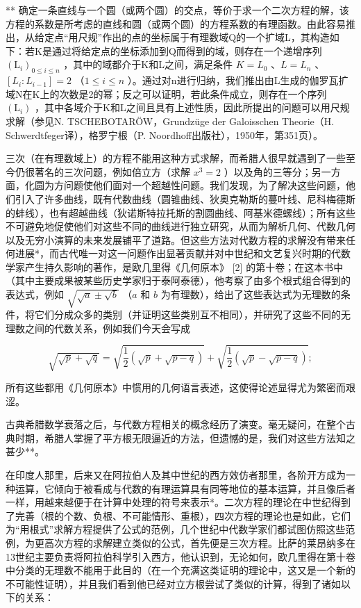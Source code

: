 ** 确定一条直线与一个圆（或两个圆）的交点，等价于求一个二次方程的解，该方程的系数是所考虑的直线和圆（或两个圆）的方程系数的有理函数。由此容易推出，从给定点“用尺规”作出的点的坐标属于有理数域Q的一个扩域L，其构造如下：若K是通过将给定点的坐标添加到Q而得到的域，则存在一个递增序列 \((\mathrm{L}_{i})_{0\leq i\leq n}\) ，其中的域都介于K和L之间，满足条件 \(K=L_{0}\) 、\(L=L_{n}\) 、\([L_{i}:L_{i-1}]=2\) （\(1\leq i\leq n\) ）。通过对n进行归纳，我们推出由L生成的伽罗瓦扩域N在K上的次数是2的幂；反之可以证明，若此条件成立，则存在一个序列 \((\mathrm{L}_{i})\) ，其中各域介于K和L之间且具有上述性质，因此所提出的问题可以用尺规求解（参见N. TSCHEBOTARÖW，Grundzüge der Galoisschen Theorie（H. Schwerdtfeger译），格罗宁根（P. Noordhoff出版社），1950年，第351页）。

三次（在有理数域上）的方程不能用这种方式求解，而希腊人很早就遇到了一些至今仍很著名的三次问题，例如倍立方（求解 \(x^3 = 2\) ）以及角的三等分；另一方面，化圆为方问题使他们面对一个超越性问题。我们发现，为了解决这些问题，他们引入了许多曲线，既有代数曲线（圆锥曲线、狄奥克勒斯的蔓叶线、尼科梅德斯的蚌线），也有超越曲线（狄诺斯特拉托斯的割圆曲线、阿基米德螺线）；所有这些不可避免地促使他们对这些不同的曲线进行独立研究，从而为解析几何、代数几何以及无穷小演算的未来发展铺平了道路。但这些方法对代数方程的求解没有带来任何进展*，而古代唯一对这一问题作出显著贡献并对中世纪和文艺复兴时期的代数学家产生持久影响的著作，是欧几里得《几何原本》 {[}2{]} 的第十卷；在这本书中（其中主要成果被某些历史学家归于泰阿泰德），他考察了由多个根式组合得到的表达式，例如 \(\sqrt{\sqrt{a} \pm \sqrt{b}}\) （\(a\) 和 \(b\) 为有理数），给出了这些表达式为无理数的条件，将它们分成众多的类别（并证明这些类别互不相同），并研究了这些不同的无理数之间的代数关系，例如我们今天会写成

\[
\sqrt {\sqrt {p} + \sqrt {q}} = \sqrt {\frac {1}{2} (\sqrt {p} + \sqrt {p - q})} + \sqrt {\frac {1}{2} (\sqrt {p} - \sqrt {p - q})};
\]

所有这些都用《几何原本》中惯用的几何语言表述，这使得论述显得尤为繁密而艰涩。

古典希腊数学衰落之后，与代数方程相关的概念经历了演变。毫无疑问，在整个古典时期，希腊人掌握了平方根无限逼近的方法，但遗憾的是，我们对这些方法知之甚少**。

在印度人那里，后来又在阿拉伯人及其中世纪的西方效仿者那里，各阶开方成为一种运算，它倾向于被看成与代数的有理运算具有同等地位的基本运算，并且像后者一样，用越来越便于在计算中处理的符号来表示*。二次方程的理论在中世纪得到了完善（根的个数、负根、不可能情形、重根），四次方程的理论也是如此，它们为“用根式”求解方程提供了公式的范例，几个世纪中代数学家们都试图仿照这些范例，为更高次方程的求解建立类似的公式，首先便是三次方程。比萨的莱昂纳多在13世纪主要负责将阿拉伯科学引入西方，他认识到，无论如何，欧几里得在第十卷中分类的无理数不能用于此目的（在一个充满这类证明的理论中，这又是一个新的不可能性证明），并且我们看到他已经对立方根尝试了类似的计算，得到了诸如以下的关系：

